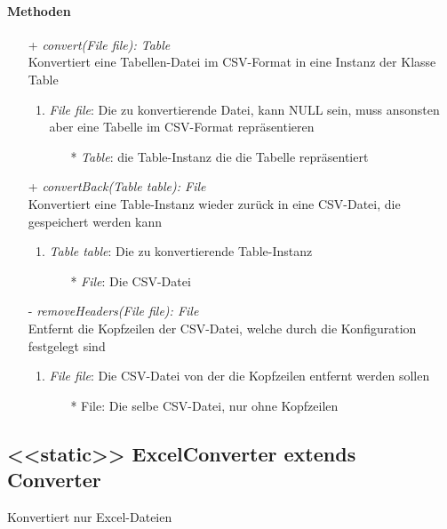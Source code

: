 \paragraph{Methoden}
\begin{itemize}
	\item[+] \textit{convert(File file): Table} \\
	Konvertiert eine Tabellen-Datei im CSV-Format in eine Instanz der Klasse Table
	\begin{enumerate}
		\item \textit{File file}: Die zu konvertierende Datei, kann NULL sein, muss ansonsten aber eine Tabelle im CSV-Format repräsentieren
		\begin{itemize}
			\item[*] \textit{Table}: die Table-Instanz die die Tabelle repräsentiert
		\end{itemize}
	\end{enumerate}
	
	\item[+] \textit{convertBack(Table table): File} \\
	Konvertiert eine Table-Instanz wieder zurück in eine CSV-Datei, die gespeichert werden kann
	\begin{enumerate}
		\item \textit{Table table}: Die zu konvertierende Table-Instanz
		\begin{itemize}
			\item[*] \textit{File}: Die CSV-Datei
		\end{itemize}
	\end{enumerate}

	\item[-] \textit{removeHeaders(File file): File} \\
	Entfernt die Kopfzeilen der CSV-Datei, welche durch die Konfiguration festgelegt sind
	\begin{enumerate}
		\item \textit{File file}: Die CSV-Datei von der die Kopfzeilen entfernt werden sollen
			\begin{itemize}
				\item[*] File: Die selbe CSV-Datei, nur ohne Kopfzeilen
			\end{itemize}
	\end{enumerate}
\end{itemize}


\subsection{<<static>> ExcelConverter extends Converter}
Konvertiert nur Excel-Dateien \\

